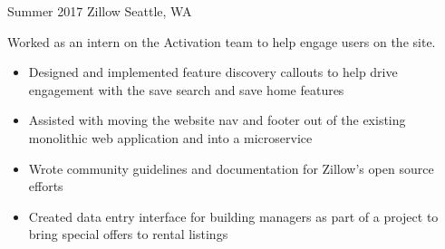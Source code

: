 \documentclass[nofooter]{resume}
\begin{document}
\begin{entrylist}

\entry
{Summer 2017}
{Zillow}
{Seattle, WA}
{Worked as an intern on the Activation team to help engage users on the site.
\noindent\begin{itemize}[leftmargin=0.45cm]
\item Designed and implemented feature discovery callouts to help drive engagement with the save search and save home features
\item Assisted with moving the website nav and footer out of the existing monolithic web application and into a microservice
\item Wrote community guidelines and documentation for Zillow's open source efforts
\item Created data entry interface for building managers as part of a project to bring special offers to rental listings
\end{itemize}}

\end{entrylist}
\end{document}
